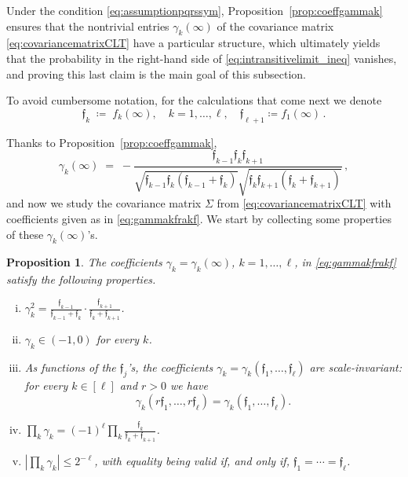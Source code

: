 \documentclass[reqno,a4paper,11pt]{amsart}
\newtheorem{proposition}[lemma]{Proposition}
\theoremstyle{remark}
\newcommand{\mf}[1]{{\mathfrak #1}}
\newcommand{\f}{{\mf f}}
\numberwithin{equation}{section}
\begin{document}

Under the condition \eqref{eq:assumptionpqrssym},
Proposition~\ref{prop:coeffgammak} ensures that the nontrivial entries
$\gamma_k(\infty)$ of the covariance matrix \eqref{eq:covariancematrixCLT} have
a particular structure, which ultimately yields that the probability in the
right-hand side of \eqref{eq:intransitivelimit_ineq} vanishes, and proving this last claim is the main goal of this subsection.

To avoid cumbersome notation, for the calculations that come next we denote
%
$$
\f_k \;\coloneqq\; f_k(\infty),\quad k=1,\hdots, \ell, \quad \f_{\ell+1}\coloneqq f_1(\infty)\,.
$$
%

Thanks to Proposition~\ref{prop:coeffgammak},
%
\begin{equation}\label{eq:gammakfrakf}
\gamma_k(\infty)\;=\;-\frac{\f_{k-1}\f_k\mf f_{k+1}}{\sqrt{\f_{k-1}\mf f_k(\f_{k-1}+\f_{k})}\sqrt{\f_{k}\f_{k+1}(\f_{k}+\f_{k+1})}}\,,
\end{equation}
%
and now we study the covariance matrix $\Sigma$ from \eqref{eq:covariancematrixCLT} with coefficients given as in \eqref{eq:gammakfrakf}. We start by collecting some properties of these $\gamma_k(\infty)$'s.

%
\begin{proposition}\label{prop:propertiescoeffgammak}
The coefficients $\gamma_k=\gamma_k(\infty)$, $k=1,\hdots,\ell$, in \eqref{eq:gammakfrakf} satisfy the following properties.
\begin{enumerate}[(i)]
\item $\displaystyle\gamma_k^2 = \frac{\f_{k-1}}{\f_{k-1}+\f_k} \cdot
    \frac{\f_{k+1}}{\f_{k}+\f_{k+1}}$.
\item $\gamma_k\in (-1,0)$ for every $k$.
\item As functions of the $\f_j$'s, the coefficients $\gamma_k=\gamma_k(\f_1, \ldots, \f_\ell)$ are scale-invariant: for every $k \in
    [\ell]$ and $r > 0$ we have
\begin{equation*}
\label{eq:gamma_k_scale_inv}
\gamma_k(r\f_1, \ldots, r\f_\ell)
    = \gamma_k(\f_1, \ldots, \f_\ell).
\end{equation*}
%
\item $\prod_{k} \gamma_k = (-1)^\ell \prod_k \frac{\f_k}{\f_k + \f_{k+1}}$.
\item $|\prod_k \gamma_k| \le 2^{-\ell}$, with equality being valid if, and only if, $\f_1=\cdots=\f_\ell$.
\end{enumerate}
\end{proposition}
\end{document}

